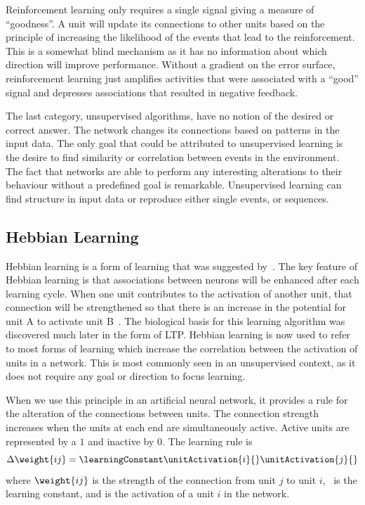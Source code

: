 Reinforcement learning only requires a single signal giving a measure of ``goodness''.  A unit will update its connections to other units based on the principle of increasing the likelihood of the events that lead to the reinforcement.  This is a somewhat blind mechanism as it has no information about which direction will improve performance.  Without a gradient on the error surface, reinforcement learning just amplifies activities that were associated with a ``good'' signal and depresses associations that resulted in negative feedback.  

The last category, unsupervised algorithms, have no notion of the desired or correct answer.  The network changes its connections based on patterns in the input data.  The only goal that could be attributed to unsupervised learning is the desire to find similarity or correlation between events in the environment.  The fact that networks are able to perform any interesting alterations to their behaviour without a predefined goal is remarkable.  Unsupervised learning can find structure in input data or reproduce either single events, or sequences.

\subsection{Hebbian Learning}
Hebbian learning is a form of learning that was suggested by~\citet{Hebb49}.  The key feature of Hebbian learning is that associations between neurons will be enhanced after each learning cycle.  When one unit contributes to the activation of another unit, that connection will be strengthened so that there is an increase in the potential for unit A to activate unit B~\citep{Hebb49}.  The biological basis for this learning algorithm was discovered much later in the form of LTP.  Hebbian learning is now used to refer to most forms of learning which increase the correlation between the activation of units in a network.  This is most commonly seen in an unsupervised context, as it does not require any goal or direction to focus learning.  

When we use this principle in an artificial neural network, it provides a rule for the alteration of the connections between units.  The connection strength increases when the units at each end are simultaneously active.  Active units are represented by a $1$ and inactive by $0$.  The learning rule is
\begin{equation}
	\label{eq:Hebbianlearning}
	\Delta\weight{ij} = \learningConstant\unitActivation{i}{}\unitActivation{j}{}
\end{equation}
where \(\weight{ij}\) is the strength of the connection from unit \(j\) to
unit \(i\), \learningConstant\  is the learning constant, and  is the activation of a unit $i$ in the network.

